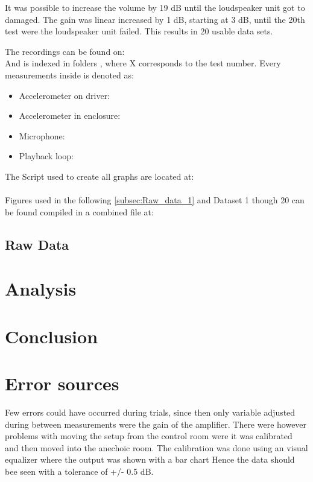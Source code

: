 It was possible to increase the volume by 19 dB until the loudspeaker unit got to damaged. The gain was linear increased by 1 dB, starting at 3 dB, until the 20th test were the loudspeaker unit failed. This results in 20 usable data sets.

The recordings can be found on:\\
And is indexed in folders , where X corresponds to the test number. Every measurements inside is denoted as:
\begin{itemize}
\item Accelerometer on driver: 
\item Accelerometer in enclosure: 
\item Microphone: 
\item Playback loop: 
\end{itemize}

The Script used to create all graphs are located at:\\
\\
Figures used in the following \ref{subsec:Raw_data_1} and Dataset 1 though 20 can be found compiled in a combined file at:


\subsection{Raw Data}

\section{Analysis}

\section{Conclusion}

\section{Error sources}

Few errors could have occurred during trials, since then only variable adjusted during between measurements were the gain of the amplifier. There were however problems with moving the setup from the control room were it was calibrated and then moved into the anechoic room. The calibration was done using an visual equalizer where the output was shown with a bar chart Hence the data should bee seen with a tolerance of +/- 0.5 dB.